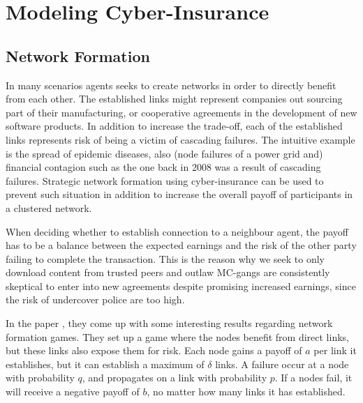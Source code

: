 \chapter{Modeling Cyber-Insurance }
\label{chp:modelingCyberInsurance} 


\section{Network Formation}


In many scenarios agents seeks to create networks in order to directly benefit from each other. The established links might represent companies out sourcing part of their manufacturing, or cooperative agreements in the development of new software products. In addition to increase the trade-off, each of the established links represents risk of being a victim of cascading failures. The intuitive example is the spread of epidemic diseases, also  (node failures of a power grid and) financial contagion such as the one back in 2008 was a result of cascading failures. Strategic network formation using cyber-insurance can be used to prevent such situation in addition to increase the overall payoff of participants in a clustered network.


When deciding whether to establish connection to a neighbour agent, the payoff has to be a balance between the expected earnings and the risk of the other party failing to complete the transaction. This is the reason why we seek to only download content from trusted peers and outlaw MC-gangs are consistently skeptical to enter into new agreements despite promising increased earnings, since the risk of undercover police are too high. 


In the paper \cite{contagion}, they come up with some interesting results regarding network formation games. 
They set up a game where the nodes benefit from direct links, but these links also expose them for risk. 
Each node gains a payoff of  $a$ per link it establishes, but it can establish a maximum of $\delta$ links.
A failure occur at a node with probability $q$, and propagates on a link with probability $p$. If a nodes fail, it will receive a negative payoff of $b$, no matter how many links it has established.

